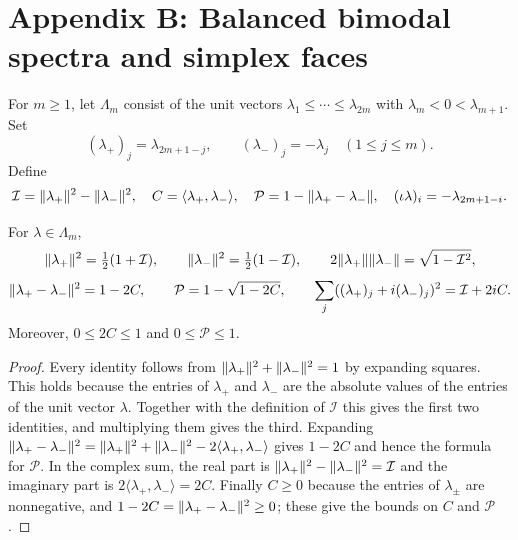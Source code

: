 \chapter{Appendix B: Balanced bimodal spectra and simplex faces}

\setcounter{definition}{1}
\renewcommand{\thedefinition}{A\arabic{definition}}
\begin{definition}
\label{def:balanced}
\leanok
For $m\ge1$, let $\Lambda_m$ consist of the unit vectors
$\lambda_1\le\cdots\le\lambda_{2m}$ with
$\lambda_m<0<\lambda_{m+1}$. Set
\[
 (\lambda_+)_j=\lambda_{2m+1-j},\qquad
 (\lambda_-)_j=-\lambda_j\quad(1\le j\le m).
\]
Define
\[
 \mathcal I=\lVert \lambda_+\rVert^2-\lVert \lambda_-\rVert^2,\quad
 C=\langle\lambda_+,\lambda_-\rangle,\quad
 \mathcal P=1-\lVert \lambda_+-\lambda_-\rVert,\quad
 (\iota\lambda)_i=-\lambda_{2m+1-i}.
\]
\end{definition}

\begin{lemma}
\label{lem:bimodal}
\leanok
{}
For $\lambda\in\Lambda_m$,
\[
 \lVert \lambda_+\rVert^2=\tfrac12(1+\mathcal I),\qquad
 \lVert \lambda_-\rVert^2=\tfrac12(1-\mathcal I),\qquad
 2\lVert \lambda_+\rVert\lVert \lambda_-\rVert=\sqrt{1-\mathcal I^2},
\]
\[
 \lVert \lambda_+-\lambda_-\rVert^2=1-2C,\qquad
 \mathcal P=1-\sqrt{1-2C},\qquad
 \sum_j((\lambda_+)_j+i(\lambda_-)_j)^2=\mathcal I+2iC.
\]
Moreover, $0\le2C\le1$ and $0\le\mathcal P\le1$.
\end{lemma}
\begin{proof}
\leanok
{}
Every identity follows from $\lVert \lambda_+\rVert^2+\lVert \lambda_-\rVert^2=1$ by
expanding squares. This holds because the entries of $\lambda_+$ and
$\lambda_-$ are the absolute values of the entries of the unit vector
$\lambda$.
Together with the definition of $\mathcal I$ this gives the first two
identities, and multiplying them gives the third. Expanding
$\lVert \lambda_+-\lambda_-\rVert^2=\lVert \lambda_+\rVert^2+\lVert \lambda_-\rVert^2-2\langle\lambda_+,\lambda_-\rangle$
gives $1-2C$ and hence the formula for $\mathcal P$. In the complex sum,
the real part is $\lVert \lambda_+\rVert^2-\lVert \lambda_-\rVert^2=\mathcal I$ and the
imaginary part is $2\langle\lambda_+,\lambda_-\rangle=2C$. Finally
$C\ge0$ because the entries of $\lambda_\pm$ are nonnegative, and
$1-2C=\lVert \lambda_+-\lambda_-\rVert^2\ge0$; these give the bounds on $C$ and
$\mathcal P$.
\end{proof}

